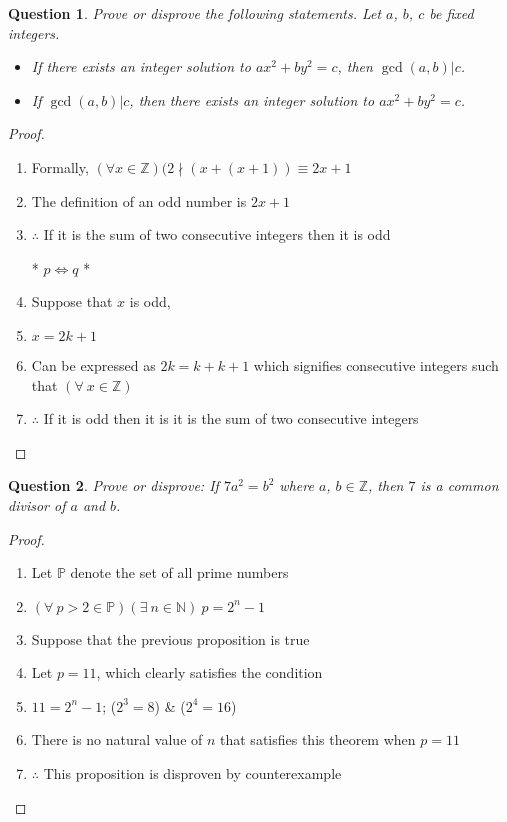 \documentclass[11pt,oneside]{article}
\newtheorem{question}{Question}
\begin{document}
\newpage

\begin{question}
    Prove or disprove the following statements. Let $a$, $b$, $c$ be fixed integers.
    \begin{itemize}
    	\item [(a)] If there exists an integer solution to $ax^2 + by^2 = c$, then $\gcd(a,b) | c$.
    	\item [(b)] If $\gcd(a,b) | c$, then there exists an integer solution to $ax^2 + by^2 = c$.
    \end{itemize}
\end{question}

\begin{proof}
    \begin{enumerate}
        \item Formally, $(\forall x \in \mathbb{Z})(2 \nmid (x + (x+1)) \equiv 2x + 1$
        \item The definition of an odd number is $2x + 1$
        \item $\therefore$ If it is the sum of two consecutive integers then it is odd \\
            \centerline{* \boldmath$p \Leftrightarrow q$ *}
        \item Suppose that $x$ is odd,
        \item $x = 2k + 1$
        \item Can be expressed as $2k = k + k + 1$ which signifies consecutive integers such that $(\forall \ x \in \mathbb{Z})$
        \item $\therefore$ If it is odd then it is it is the sum of two consecutive integers
    \end{enumerate}
\end{proof}

\bigskip

\begin{question}
    Prove or disprove: If $7a^2 = b^2$ where $a$, $b \in \mathbb{Z}$, then $7$ is a common divisor of $a$ and $b$.
\end{question}

\begin{proof}
    \begin{enumerate}
        \item Let $\mathbb{P}$ denote the set of all prime numbers
        \item $(\forall \ p > 2 \in \mathbb{P})(\exists \ n \in \mathbb{N})\ p = 2^n - 1$
        \item Suppose that the previous proposition is true
        \item Let $p = 11$, which clearly satisfies the condition
        \item $11 = 2^n - 1$; ($2^3 = 8$) \& ($2^4 = 16$)
        \item There is no natural value of $n$ that satisfies this theorem when $p=11$
        \item  $\therefore$ This proposition is disproven by counterexample
    \end{enumerate}
\end{proof}
\end{document}
